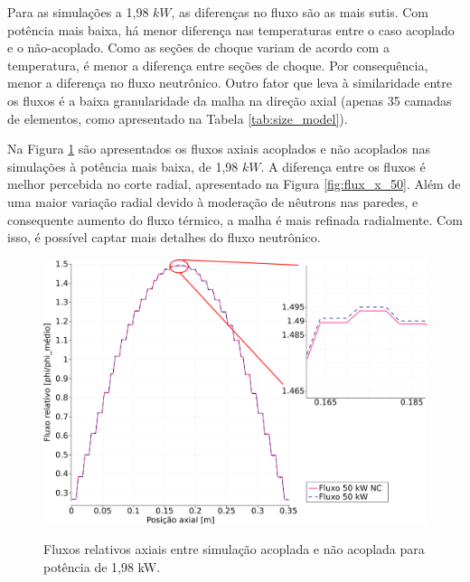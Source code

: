 Para as simulações a 1,98 $kW$, as diferenças no fluxo são as mais sutis. Com potência mais baixa, há menor
diferença nas temperaturas entre o caso acoplado e o não-acoplado. Como as seções de choque variam de
acordo com a temperatura, é menor a diferença entre seções de choque. Por consequência, menor a diferença
no fluxo neutrônico. Outro fator que leva à similaridade entre os fluxos é a baixa granularidade
da malha na direção axial (apenas 35 camadas de elementos, como apresentado na Tabela \ref{tab:size_model}).

Na Figura \ref{fig:flux_z_50} são apresentados os fluxos axiais acoplados e não acoplados nas simulações
à potência mais baixa, de 1,98 $kW$. A diferença entre os fluxos é melhor percebida no corte radial,
apresentado na Figura \ref{fig:flux_x_50}. Além de uma maior variação radial devido à moderação de nêutrons
nas paredes, e consequente aumento do fluxo térmico, a malha é mais refinada radialmente. Com isso, é possível
captar mais detalhes do fluxo neutrônico.


\begin{figure}[htb]
  \caption{Fluxos relativos axiais entre simulação acoplada e não acoplada para
    potência de 1,98 kW.}
  \centering\includegraphics[scale=0.5]{figuras/Flux_rel_z_50_port_trabalhado.png}
  \label{fig:flux_z_50}
\end{figure}

